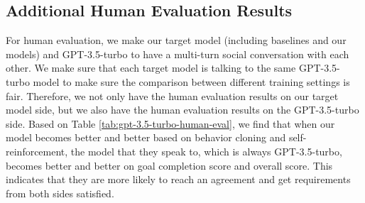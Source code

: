 \subsection{Additional Human Evaluation Results}
\label{appendix:additional-human-eval-results}
For human evaluation, we make our target model (including baselines and our \model models) and GPT-3.5-turbo to have a multi-turn social conversation with each other. We make sure that each target model is talking to the same GPT-3.5-turbo model to make sure the comparison between different training settings is fair. Therefore, we not only have the human evaluation results on our target model side, but we also have the human evaluation results on the GPT-3.5-turbo side. Based on Table \ref{tab:gpt-3.5-turbo-human-eval}, we find that when our model becomes better and better based on behavior cloning and self-reinforcement, the model that they speak to, which is always GPT-3.5-turbo, becomes better and better on goal completion score and overall score. This indicates that they are more likely to reach an agreement and get requirements from both sides satisfied.

